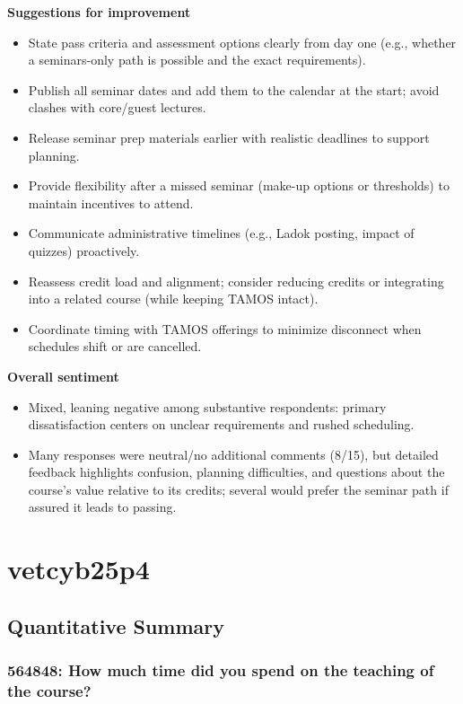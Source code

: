 \documentclass[a4paper]{report}
\begin{document}
\textbf{Suggestions for improvement}
\begin{itemize}
\item State pass criteria and assessment options clearly from day one (e.g., whether a seminars-only path is possible and the exact requirements).
\item Publish all seminar dates and add them to the calendar at the start; avoid clashes with core/guest lectures.
\item Release seminar prep materials earlier with realistic deadlines to support planning.
\item Provide flexibility after a missed seminar (make-up options or thresholds) to maintain incentives to attend.
\item Communicate administrative timelines (e.g., Ladok posting, impact of quizzes) proactively.
\item Reassess credit load and alignment; consider reducing credits or integrating into a related course (while keeping TAMOS intact).
\item Coordinate timing with TAMOS offerings to minimize disconnect when schedules shift or are cancelled.
\end{itemize}

\textbf{Overall sentiment}
\begin{itemize}
\item Mixed, leaning negative among substantive respondents: primary dissatisfaction centers on unclear requirements and rushed scheduling.
\item Many responses were neutral/no additional comments (8/15), but detailed feedback highlights confusion, planning difficulties, and questions about the course’s value relative to its credits; several would prefer the seminar path if assured it leads to passing.
\end{itemize}


\chapter{vetcyb25p4}

\section{Quantitative Summary}

\subsection{564848: How much time did you spend on the teaching of the course?}
\end{document}
